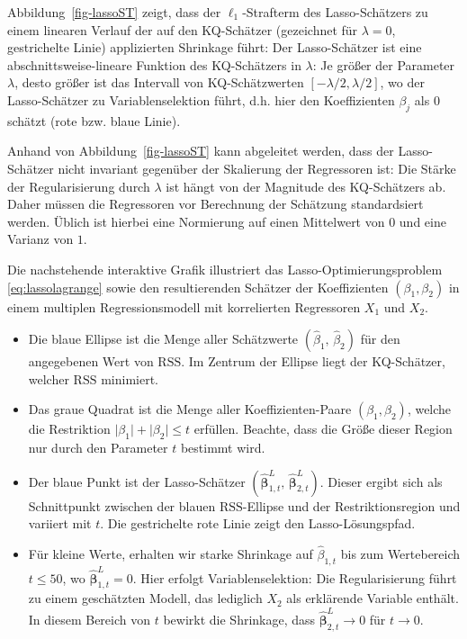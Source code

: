 \documentclass[
  a4paper,
  DIV=11,
  oneside]{scrreprt}
\begin{document}
Abbildung~\ref{fig-lassoST} zeigt, dass der \(\ell_1\)-Strafterm des
Lasso-Schätzers zu einem linearen Verlauf der auf den KQ-Schätzer
(gezeichnet für \(\lambda = 0\), gestrichelte Linie) applizierten
Shrinkage führt: Der Lasso-Schätzer ist eine abschnittsweise-lineare
Funktion des KQ-Schätzers in \(\lambda\): Je größer der Parameter
\(\lambda\), desto größer ist das Intervall von KQ-Schätzwerten
\([-\lambda/2,\lambda/2]\), wo der Lasso-Schätzer zu Variablenselektion
führt, d.h. hier den Koeffizienten \(\beta_j\) als \(0\) schätzt (rote
bzw. blaue Linie).

Anhand von Abbildung~\ref{fig-lassoST} kann abgeleitet werden, dass der
Lasso-Schätzer nicht invariant gegenüber der Skalierung der Regressoren
ist: Die Stärke der Regularisierung durch \(\lambda\) ist hängt von der
Magnitude des KQ-Schätzers ab. Daher müssen die Regressoren vor
Berechnung der Schätzung standardsiert werden. Üblich ist hierbei eine
Normierung auf einen Mittelwert von \(0\) und eine Varianz von \(1\).

Die nachstehende interaktive Grafik illustriert das
Lasso-Optimierungsproblem \eqref{eq:lassolagrange} sowie den
resultierenden Schätzer der Koeffizienten \((\beta_1, \beta_2)\) in
einem multiplen Regressionsmodell mit korrelierten Regressoren \(X_1\)
und \(X_2\).

\begin{itemize}
\item
  Die blaue Ellipse ist die Menge aller Schätzwerte
  \(\left(\widehat\beta_{1},\, \widehat\beta_{2}\right)\) für den
  angegebenen Wert von \(\mathrm{RSS}\). Im Zentrum der Ellipse liegt
  der KQ-Schätzer, welcher \(\mathrm{RSS}\) minimiert.
\item
  Das graue Quadrat ist die Menge aller Koeffizienten-Paare
  \((\beta_1, \beta_2)\), welche die Restriktion
  \(\lvert\beta_1\rvert+\lvert\beta_2\rvert\leq t\) erfüllen. Beachte,
  dass die Größe dieser Region nur durch den Parameter \(t\) bestimmt
  wird.
\item
  Der blaue Punkt ist der Lasso-Schätzer
  \((\widehat{\boldsymbol{\beta}}^L_{1,t},\, \widehat{\boldsymbol{\beta}}^L_{2,t})\).
  Dieser ergibt sich als Schnittpunkt zwischen der blauen
  \(\mathrm{RSS}\)-Ellipse und der Restriktionsregion und variiert mit
  \(t\). Die gestrichelte rote Linie zeigt den Lasso-Lösungspfad.
\item
  Für kleine Werte, erhalten wir starke Shrinkage auf
  \(\widehat\beta_{1,t}\) bis zum Wertebereich \(t\leq50\), wo
  \(\widehat{\boldsymbol{\beta}}^L_{1,t}=0\). Hier erfolgt
  Variablenselektion: Die Regularisierung führt zu einem geschätzten
  Modell, das lediglich \(X_2\) als erklärende Variable enthält. In
  diesem Bereich von \(t\) bewirkt die Shrinkage, dass
  \(\widehat{\boldsymbol{\beta}}^L_{2,t}\to0\) für \(t\to0\).
\end{itemize}
\end{document}
